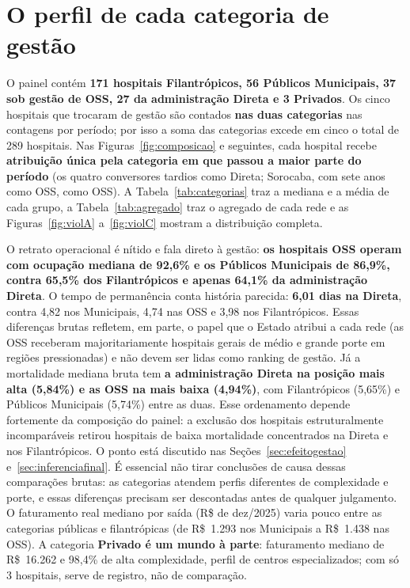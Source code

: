 \section{O perfil de cada categoria de gestão}
\label{sec:categorias}

O painel contém \textbf{171 hospitais Filantrópicos, 56 Públicos
Municipais, 37 sob gestão de OSS, 27 da administração Direta e 3
Privados}. Os cinco hospitais que trocaram de gestão são contados
\textbf{nas duas categorias} nas contagens por período; por isso a soma
das categorias excede em cinco o total de 289 hospitais. Nas
Figuras~\ref{fig:composicao} e seguintes, cada hospital recebe
\textbf{atribuição única pela categoria em que passou a maior parte do
período} (os quatro conversores tardios como Direta; Sorocaba, com sete
anos como OSS, como OSS). A
Tabela~\ref{tab:categorias} traz a mediana e a média de cada grupo, a
Tabela~\ref{tab:agregado} traz o agregado de cada rede e as
Figuras~\ref{fig:violA} a~\ref{fig:violC} mostram a distribuição
completa.

O retrato operacional é nítido e fala direto à gestão: \textbf{os
hospitais OSS operam com ocupação mediana de 92,6\% e os Públicos
Municipais de 86,9\%, contra 65,5\% dos Filantrópicos e apenas 64,1\%
da administração Direta}. O tempo de permanência conta história
parecida: \textbf{6,01 dias na Direta}, contra 4,82 nos Municipais,
4,74 nas OSS e 3,98 nos Filantrópicos. Essas diferenças brutas refletem,
em parte, o papel que o Estado atribui a cada rede (as OSS receberam
majoritariamente hospitais gerais de médio e grande porte em regiões
pressionadas) e não devem ser lidas como ranking de gestão. Já a
mortalidade mediana bruta tem \textbf{a administração Direta na
posição mais alta (5,84\%) e as OSS na mais baixa (4,94\%)}, com
Filantrópicos (5,65\%) e Públicos Municipais (5,74\%) entre as duas.
Esse ordenamento depende fortemente da composição do painel: a exclusão
dos hospitais estruturalmente incomparáveis retirou hospitais de baixa
mortalidade concentrados na Direta e nos Filantrópicos. O ponto está
discutido nas Seções~\ref{sec:efeitogestao} e~\ref{sec:inferenciafinal}.
É essencial não tirar conclusões de
causa dessas comparações brutas: as categorias atendem perfis
diferentes de complexidade e porte, e essas diferenças precisam ser
descontadas antes de qualquer julgamento. O faturamento real mediano por
saída (R\$ de dez/2025)
varia pouco entre as categorias públicas e filantrópicas (de R\$~1.293
nos Municipais a R\$~1.438 nas OSS). A categoria \textbf{Privado é um
mundo à parte}: faturamento mediano de R\$~16.262 e 98,4\% de alta
complexidade, perfil de centros especializados; com só 3 hospitais,
serve de registro, não de comparação.

